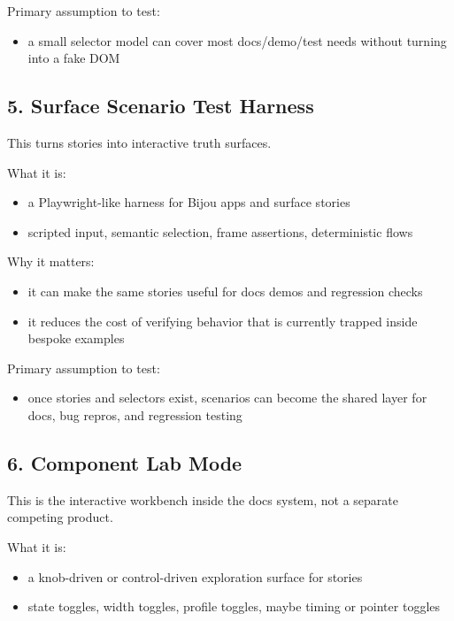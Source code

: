 Primary assumption to test:

\begin{itemize}
\tightlist
\item
  a small selector model can cover most docs/demo/test needs without turning into a fake DOM
\end{itemize}

\subsection{5. Surface Scenario Test Harness}\label{record-042-surface-scenario-test-harness}

This turns stories into interactive truth surfaces.

What it is:

\begin{itemize}
\tightlist
\item
  a Playwright-like harness for Bijou apps and surface stories
\item
  scripted input, semantic selection, frame assertions, deterministic flows
\end{itemize}

Why it matters:

\begin{itemize}
\tightlist
\item
  it can make the same stories useful for docs demos and regression checks
\item
  it reduces the cost of verifying behavior that is currently trapped inside bespoke examples
\end{itemize}

Primary assumption to test:

\begin{itemize}
\tightlist
\item
  once stories and selectors exist, scenarios can become the shared layer for docs, bug repros, and regression testing
\end{itemize}

\subsection{6. Component Lab Mode}\label{record-042-component-lab-mode}

This is the interactive workbench inside the docs system, not a separate competing product.

What it is:

\begin{itemize}
\tightlist
\item
  a knob-driven or control-driven exploration surface for stories
\item
  state toggles, width toggles, profile toggles, maybe timing or pointer toggles
\end{itemize}

